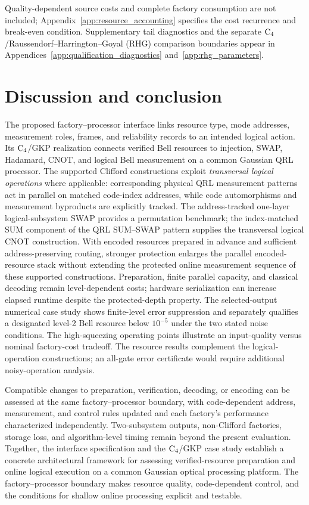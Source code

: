 \documentclass[aps,
prx,
superscriptaddress,
reprint,
longbibliography,
floatfix]{revtex4-2}
\begin{document}
Quality-dependent source costs and complete factory consumption are not included; Appendix~\ref{app:resource_accounting} specifies the cost recurrence and break-even condition. Supplementary tail diagnostics and the separate ${\rm C_4}$/Raussendorf--Harrington--Goyal (RHG) comparison boundaries appear in Appendices~\ref{app:qualification_diagnostics} and~\ref{app:rhg_parameters}.

\section{Discussion and conclusion}\label{sec:disc}
The proposed factory--processor interface links resource type, mode addresses, measurement roles, frames, and reliability records to an intended logical action. Its ${\rm C_4}$/GKP realization connects verified Bell resources to injection, SWAP, Hadamard, CNOT, and logical Bell measurement on a common Gaussian QRL processor.
The supported Clifford constructions exploit \emph{transversal logical operations} where applicable: corresponding physical QRL measurement patterns act in parallel on matched code-index addresses, while code automorphisms and measurement byproducts are explicitly tracked. The address-tracked one-layer logical-subsystem SWAP provides a permutation benchmark; the index-matched SUM component of the QRL SUM--SWAP pattern supplies the transversal logical CNOT construction. With encoded resources prepared in advance and sufficient address-preserving routing, stronger protection enlarges the parallel encoded-resource stack without extending the protected online measurement sequence of these supported constructions. Preparation, finite parallel capacity, and classical decoding remain level-dependent costs; hardware serialization can increase elapsed runtime despite the protected-depth property. 
The selected-output numerical case study shows finite-level error suppression and separately qualifies a designated level-2 Bell resource below $10^{-5}$ under the two stated noise conditions. The high-squeezing operating points illustrate an input-quality versus nominal factory-cost tradeoff. The resource results complement the logical-operation constructions; an all-gate error certificate would require additional noisy-operation analysis.

Compatible changes to preparation, verification, decoding, or encoding can be assessed at the same factory--processor boundary, with code-dependent address, measurement, and control rules updated and each factory's performance characterized independently. Two-subsystem outputs, non-Clifford factories, storage loss, and algorithm-level timing remain beyond the present evaluation. Together, the interface specification and the ${\rm C_4}$/GKP case study establish a concrete architectural framework for assessing verified-resource preparation and online logical execution on a common Gaussian optical processing platform. The factory--processor boundary makes resource quality, code-dependent control, and the conditions for shallow online processing explicit and testable.
\end{document}
